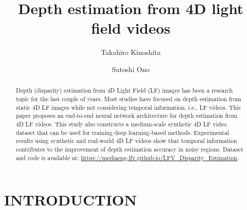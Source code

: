 \documentclass[]{spie}
\title{Depth estimation from 4D light field videos}
\author[a]{Takahiro Kinoshita}
\author[a]{Satoshi Ono}
\affil[a]{Kagoshima University, Japan}
\newcommand{\jtextd}[1]{}
\begin{document}
 
\maketitle

\begin{abstract}
\jtextd{
   4Dライトフィールド（LF）画像を用いた奥行き（視差）推定は，
   ここ数年，活発に研究されている．従来研究では，静的な4D LF画像
   を用いた奥行き推定に焦点が当てられており，時間情報が利用されておらず，
   LF映像を用いて奥行きを推定する研究は行われていない． 本論文では，
   4D LF映像を用いた奥行き推定を目的としたエンドツーエンドの学習を
   可能にするニューラルネットワークアーキテクチャを提案する．
   また，深層学習モデルを十分に訓練可能な中規模4D LF映像データセットを構築する．
合成映像および実撮影映像の双方を用いた実験により，
   時間情報を活用することでノイズが多い領域の奥行き推定が可能であることを示した．
}
Depth (disparity) estimation from 4D Light Field (LF) images
has been a research topic for the last couple of years.
Most studies have focused on depth estimation from static 4D LF images
while not considering temporal information, i.e., LF videos.
This paper proposes an end-to-end neural network architecture 
for depth estimation from 4D LF videos.
This study also constructs a medium-scale synthetic 4D LF video dataset that 
can be used for training deep learning-based methods.
Experimental results using synthetic and real-world 4D LF videos 
show that temporal information contributes to the improvement of 
depth estimation accuracy in noisy regions.
Dataset and code is available at: 
\url{https://mediaeng-lfv.github.io/LFV_Disparity_Estimation}.
\end{abstract}





\section{INTRODUCTION}
\label{sec:intro}  \jtextd{
   コンピュテーショナルフォトグラフィ（Computational Photography: CP）は，
   撮影後の画像処理により通常のカメラでは撮影できなかった写真を合成できるため，
   近年大きな注目を集めている．
主要なCP技術の1つであるライトフィールドイメージングは，
異なる複数の方向からの光線量を捉えることができる．
2つの空間パラメータと2つの角度パラメータで表現される
   4Dライトフィールド画像（Light Field Images: LFIs）の
   撮影は，カメラアレイや
1台の移動カメラで構成されたガントリー，
LytroやRaytrixのような特別に設計された
   プレノプティックカメラ~\cite{ng2005light}等により行える．
4D LFIsに記録された空間角度情報は，
   デジタルリフォーカス~\cite{ng2005light}，
素材分類~\cite{wang20164d}，
   超解像~\cite{zhang2019residual}，
   最近では奥行き推定~\cite{tao2013depth,shin2018epinet,leistner2019learning}
など
   多くのコンピュータビジョンアプリケーションの性能向上に利用されている．
}
\end{document}

